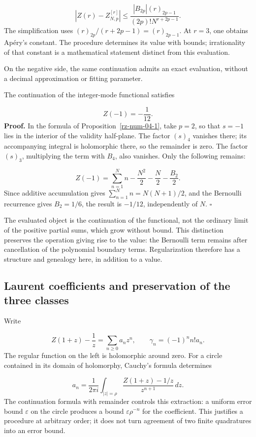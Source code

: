 \[
\left|Z(r)-Z_{N,p}^{[r]}\right|
\leq\frac{|B_{2p}|(r)_{2p-1}}{(2p)!N^{r+2p-1}}.
\]
The simplification uses \((r)_{2p}/(r+2p-1)=(r)_{2p-1}\). At \(r=3\), one obtains Apéry's constant. The procedure determines its value with bounds; irrationality of that constant is a mathematical statement distinct from this evaluation.

On the negative side, the same continuation admits an exact evaluation, without a decimal approximation or fitting parameter.

The continuation of the integer-mode functional satisfies

\[
Z(-1)=-\frac1{12}.
\]
\textbf{Proof.} In the formula of Proposition~\ref{rz-num-04-1}, take \(p=2\), so that \(s=-1\) lies in the interior of the validity half-plane. The factor \((s)_4\) vanishes there; its accompanying integral is holomorphic there, so the remainder is zero. The factor \((s)_3\), multiplying the term with \(B_4\), also vanishes. Only the following remains:

\[
Z(-1)=\sum_{n=1}^N n-\frac{N^2}{2}-\frac N2-\frac{B_2}{2}.
\]
Since additive accumulation gives \(\sum_{n=1}^N n=N(N+1)/2\), and the Bernoulli recurrence gives \(B_2=1/6\), the result is \(-1/12\), independently of \(N\). \hfill\(\square\)

The evaluated object is the continuation of the functional, not the ordinary limit of the positive partial sums, which grow without bound. This distinction preserves the operation giving rise to the value: the Bernoulli term remains after cancellation of the polynomial boundary terms. Regularization therefore has a structure and genealogy here, in addition to a value.

\subsection{Laurent coefficients and preservation of the three classes}
Write

\[
Z(1+z)-\frac1z=\sum_{n\geq0}a_nz^n,
\qquad \gamma_n=(-1)^nn!a_n.
\]
The regular function on the left is holomorphic around zero. For a circle contained in its domain of holomorphy, Cauchy's formula determines

\[
a_n=\frac1{2\pi i}\int_{|z|=\rho}
\frac{Z(1+z)-1/z}{z^{n+1}}\,dz.
\]
The continuation formula with remainder controls this extraction: a uniform error bound \(\varepsilon\) on the circle produces a bound \(\varepsilon\rho^{-n}\) for the coefficient. This justifies a procedure at arbitrary order; it does not turn agreement of two finite quadratures into an error bound.


